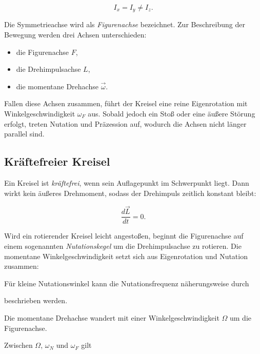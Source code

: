 \[
    I_x = I_y \neq I_z.
\]


Die Symmetrieachse wird als \emph{Figurenachse} bezeichnet.  
Zur Beschreibung der Bewegung werden drei Achsen unterschieden:
\begin{itemize}
    \item die Figurenachse $F$,
    \item die Drehimpulsachse $L$,
    \item die momentane Drehachse $\vec{\omega}$.
\end{itemize}


Fallen diese Achsen zusammen, führt der Kreisel eine reine Eigenrotation mit Winkelgeschwindigkeit $\omega_F$ aus.  
Sobald jedoch ein Stoß oder eine äußere Störung erfolgt, treten Nutation und Präzession auf, wodurch die Achsen nicht länger parallel sind.


\subsection{Kräftefreier Kreisel}\label{ssec:NonFKrei}

Ein Kreisel ist \emph{kräftefrei}, wenn sein Auflagepunkt im Schwerpunkt liegt.  
Dann wirkt kein äußeres Drehmoment, sodass der Drehimpuls zeitlich konstant bleibt:

\[
    \frac{d\vec{L}}{dt} = 0.
\]


Wird ein rotierender Kreisel leicht angestoßen, beginnt die Figurenachse auf einem sogenannten \emph{Nutationskegel} um die Drehimpulsachse zu rotieren.  
Die momentane Winkelgeschwindigkeit setzt sich aus Eigenrotation und Nutation zusammen:


Für kleine Nutationswinkel kann die Nutationsfrequenz näherungsweise durch


beschrieben werden.


Die momentane Drehachse wandert mit einer Winkelgeschwindigkeit $\Omega$ um die Figurenachse. 

Zwischen $\Omega$, $\omega_N$ und $\omega_F$ gilt

